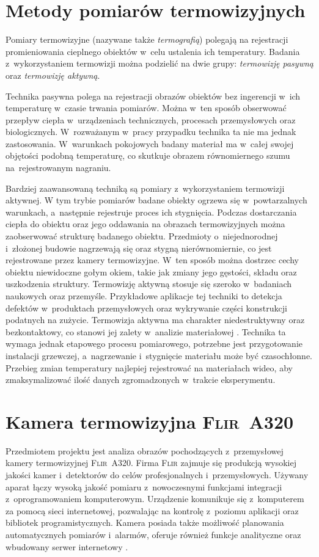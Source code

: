 \section{Metody pomiarów termowizyjnych}
\label{sec:thermovision}
Pomiary termowizyjne (nazywane także \emph{termografią}) polegają na rejestracji 
promieniowania cieplnego obiektów w~celu ustalenia ich temperatury.
Badania z~wykorzystaniem termowizji można podzielić na dwie grupy:
\emph{termowizję pasywną} oraz \emph{termowizję aktywną}.

Technika pasywna polega na rejestracji obrazów obiektów bez ingerencji w~ich
temperaturę w~czasie trwania pomiarów.
Można w~ten sposób obserwować przepływ ciepła w~urządzeniach technicznych,
procesach przemysłowych oraz biologicznych.
W~rozważanym w~pracy przypadku technika ta nie ma jednak zastosowania.
W~warunkach pokojowych badany materiał ma w~całej swojej objętości podobną
temperaturę, co skutkuje obrazem równomiernego szumu na~rejestrowanym nagraniu.

Bardziej zaawansowaną techniką są pomiary z~wykorzystaniem termowizji aktywnej.
W tym trybie pomiarów badane obiekty ogrzewa się w~powtarzalnych warunkach,
a~następnie rejestruje proces ich stygnięcia.
Podczas dostarczania ciepła do obiektu oraz jego oddawania na obrazach
termowizyjnych można zaobserwować strukturę badanego obiektu.
Przedmioty o~niejednorodnej i~złożonej budowie nagrzewają się oraz stygną
nierównomiernie, co jest rejestrowane przez kamery termowizyjne.
W~ten sposób można dostrzec cechy obiektu niewidoczne gołym okiem, takie jak 
zmiany jego gęstości, składu oraz uszkodzenia struktury.
Termowizję aktywną stosuje się szeroko w~badaniach naukowych oraz przemyśle.
Przykładowe aplikacje tej techniki to detekcja defektów w~produktach
przemysłowych oraz wykrywanie części konstrukcji podatnych na zużycie.
Termowizja aktywna ma charakter niedestruktywny oraz bezkontaktowy, co stanowi
jej zalety w~analizie materiałowej \cite{ciampa_thermography}.
Technika ta wymaga jednak etapowego procesu pomiarowego, potrzebne jest
przygotowanie instalacji grzewczej, a~nagrzewanie i~stygnięcie materiału może
być czasochłonne.
Przebieg zmian temperatury najlepiej rejestrować na materiałach wideo, aby
zmaksymalizować ilość danych zgromadzonych w~trakcie eksperymentu.

\section{Kamera termowizyjna \textsc{Flir~A320}}
\label{sec:camera}
Przedmiotem projektu jest analiza obrazów pochodzących z~przemysłowej kamery
termowizyjnej \textsc{Flir~A320}.
Firma \textsc{Flir} zajmuje się produkcją wysokiej jakości kamer i~detektorów do
celów profesjonalnych i~przemysłowych.
Używany aparat łączy wysoką jakość pomiaru z~nowoczesnymi funkcjami integracji
z~oprogramowaniem komputerowym.
Urządzenie komunikuje się z~komputerem za pomocą sieci internetowej, pozwalając
na kontrolę z~poziomu aplikacji oraz bibliotek programistycznych.
Kamera posiada także możliwość planowania automatycznych pomiarów i~alarmów,
oferuje również funkcje analityczne oraz wbudowany serwer internetowy
\cite{flir_a32x_manual}.

